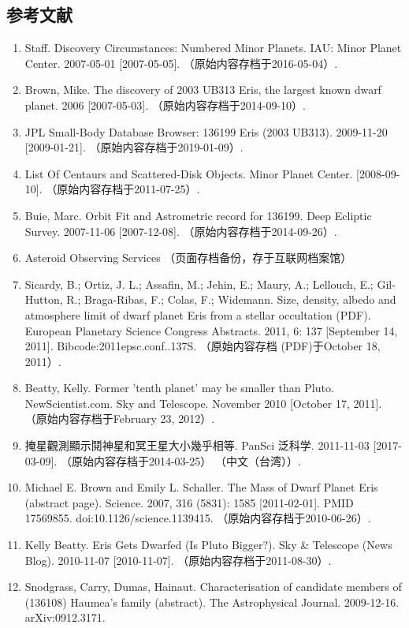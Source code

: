 \subsection{参考文献}
\begin{enumerate}
\item Staff. Discovery Circumstances: Numbered Minor Planets. IAU: Minor Planet Center. 2007-05-01 [2007-05-05]. （原始内容存档于2016-05-04）.
\item Brown, Mike. The discovery of 2003 UB313 Eris, the largest known dwarf planet. 2006 [2007-05-03]. （原始内容存档于2014-09-10）.
\item JPL Small-Body Database Browser: 136199 Eris (2003 UB313). 2009-11-20 [2009-01-21]. （原始内容存档于2019-01-09）.
\item List Of Centaurs and Scattered-Disk Objects. Minor Planet Center. [2008-09-10]. （原始内容存档于2011-07-25）.
\item Buie, Marc. Orbit Fit and Astrometric record for 136199. Deep Ecliptic Survey. 2007-11-06 [2007-12-08]. （原始内容存档于2014-09-26）.
\item Asteroid Observing Services （页面存档备份，存于互联网档案馆）
\item Sicardy, B.; Ortiz, J. L.; Assafin, M.; Jehin, E.; Maury, A.; Lellouch, E.; Gil-Hutton, R.; Braga-Ribas, F.; Colas, F.; Widemann. Size, density, albedo and atmosphere limit of dwarf planet Eris from a stellar occultation (PDF). European Planetary Science Congress Abstracts. 2011, 6: 137 [September 14, 2011]. Bibcode:2011epsc.conf..137S. （原始内容存档 (PDF)于October 18, 2011）.
\item Beatty, Kelly. Former 'tenth planet' may be smaller than Pluto. NewScientist.com. Sky and Telescope. November 2010 [October 17, 2011]. （原始内容存档于February 23, 2012）.
\item 掩星觀測顯示鬩神星和冥王星大小幾乎相等. PanSci 泛科学. 2011-11-03 [2017-03-09]. （原始内容存档于2014-03-25） （中文（台湾））.
\item Michael E. Brown and Emily L. Schaller. The Mass of Dwarf Planet Eris (abstract page). Science. 2007, 316 (5831): 1585 [2011-02-01]. PMID 17569855. doi:10.1126/science.1139415. （原始内容存档于2010-06-26）.
\item Kelly Beatty. Eris Gets Dwarfed (Is Pluto Bigger?). Sky & Telescope (News Blog). 2010-11-07 [2010-11-07]. （原始内容存档于2011-08-30）.
\item Snodgrass, Carry, Dumas, Hainaut. Characterisation of candidate members of (136108) Haumea's family (abstract). The Astrophysical Journal. 2009-12-16. arXiv:0912.3171.

\end{enumerate}
